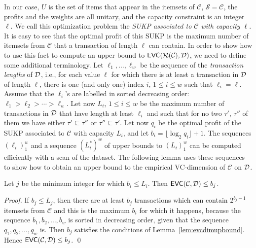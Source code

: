 In our case, $U$ is the set of items that appear in the itemsets of
$\mathcal{C}$, $\mathcal{S}=\mathcal{C}$, the profits and the weights are all
unitary, and the capacity constraint is an integer $\ell$. We call this
optimization problem the \emph{SUKP associated to $\mathcal{C}$ with capacity
$\ell$}.
It is easy to see %
that the optimal profit of this SUKP is the maximum number
of itemsets from $\mathcal{C}$ that a transaction of length $\ell$ can contain.  %
In order to show how to use this fact to compute an upper bound to
$\mathsf{EVC}(\mathcal{R}(\mathcal{C}),{\cal D})$, we need to define some additional terminology. Let
$\ell_1,\dotsc,\ell_w$ be the sequence of the
\emph{transaction lengths} of ${\cal D}$, i.e., for each value $\ell$
for which there is at least a transaction in ${\cal D}$ of length $\ell$, there is
one (and only one) index $i$, $1\le i\le w$ such that $\ell_i=\ell$. Assume that
the $\ell_i$'s are labelled in sorted decreasing order:
$\ell_1>\ell_2>\dotsb>\ell_w$. Let now $L_i$, $1\le i\le w$ be the maximum number of
transactions in ${\cal D}$ that have length at least $\ell_i$ and such that
for no two $\tau'$, $\tau''$ of them we have either $\tau'\subseteq\tau''$ or
$\tau''\subseteq\tau'$. Let now $q_i$ be the optimal profit of the SUKP associated to
$\mathcal{C}$ with capacity $L_i$, and let $b_i=\lfloor \log_2q_i\rfloor +1$.
The sequences $(\ell_i)_1^w$ and a sequence $(L_i^*)^w$ of upper bounds to
$(L_i)_1^w$ can be computed efficiently with a scan of the dataset. 
The following lemma uses these sequences to show how to obtain an upper bound to
the empirical VC-dimension of $\mathcal{C}$ on ${\cal D}$.

\begin{lemma}\label{lem:sukpevc}
  Let $j$ be the minimum integer for which $b_i\le L_i$. Then
  $\mathsf{EVC}(\mathcal{C},{\cal D})\le b_j$. %
\end{lemma}
\ifarxiv
\begin{proof}
  If $b_j\le L_j$, then there are at least $b_j$ transactions which can contain
  $2^{b_j-1}$ itemsets from $\mathcal{C}$ and this is the maximum $b_i$ for
  which it happens, because the sequence $b_1,b_2,\dotsc,b_w$ is sorted in
  decreasing order, given that the sequence $q_1,q_2,\dotsc,q_w$ is. Then $b_j$
  satisfies the conditions of Lemma~\ref{lem:evcdimupbound}. Hence
  $\mathsf{EVC}(\mathcal{C},{\cal D})\le b_j$.
  \qed
\end{proof}
\fi

